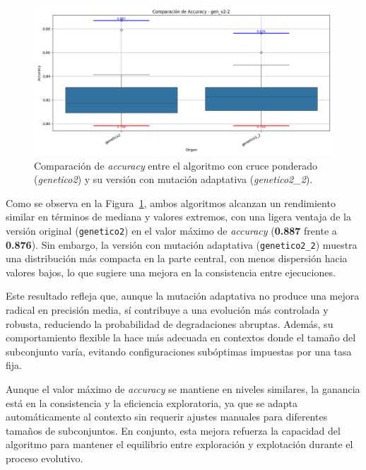 \begin{figure}[H]
    \centering
    \includegraphics[width=1\textwidth]{imagenes/evaluaciones/mutacion-adaptativa}
    \caption{Comparación de \textit{accuracy} entre el algoritmo con cruce ponderado (\textit{genetico2}) y su versión con mutación adaptativa (\textit{genetico2\_2}).}
    \label{fig:mutacion-adaptativa}
\end{figure}

Como se observa en la Figura~\ref{fig:mutacion-adaptativa}, ambos algoritmos alcanzan un rendimiento similar en términos de mediana y valores extremos, 
con una ligera ventaja de la versión original (\texttt{genetico2}) en el valor máximo de \textit{accuracy} (\textbf{0.887} frente a \textbf{0.876}).
Sin embargo, la versión con mutación adaptativa (\texttt{genetico2\_2}) muestra una distribución más compacta en la parte central, 
con menos dispersión hacia valores bajos, lo que sugiere una mejora en la consistencia entre ejecuciones.

Este resultado refleja que, aunque la mutación adaptativa no produce una mejora radical en precisión media,
 sí contribuye a una evolución más controlada y robusta, reduciendo la probabilidad de degradaciones abruptas.
Además, su comportamiento flexible la hace más adecuada en contextos donde el tamaño del subconjunto varía, 
evitando configuraciones subóptimas impuestas por una tasa fija.

Aunque el valor máximo de \textit{accuracy} se mantiene en niveles similares, la ganancia está en la consistencia y la eficiencia exploratoria, 
ya que se adapta automáticamente al contexto sin requerir ajustes manuales para diferentes tamaños de subconjuntos.
En conjunto, esta mejora refuerza la capacidad del algoritmo para mantener el equilibrio entre exploración y explotación durante el proceso evolutivo.


